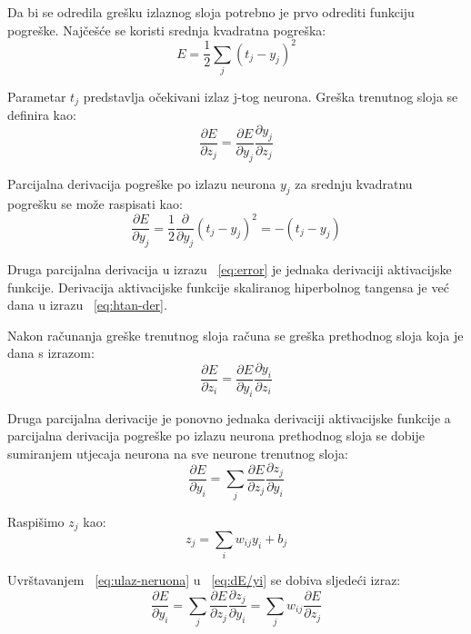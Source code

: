 \documentclass[times, utf8, zavrsni, numeric]{fer}
\begin{document}
Da bi se odredila grešku izlaznog sloja potrebno je prvo odrediti funkciju pogreške. Najčešće se koristi srednja kvadratna pogreška:
\begin{equation}\label{eq:sr-kv-pogr}
  E = \frac{1}{2}\sum_j(t_j-y_j)^2
\end{equation}

Parametar $t_j$ predstavlja očekivani izlaz j-tog neurona. Greška trenutnog sloja se definira kao:
\begin{equation}\label{eq:error}
\dfrac{\partial E}{\partial z_j} = \dfrac{\partial E}{\partial y_j} \dfrac{\partial y_j}{\partial z_j}
\end{equation}

Parcijalna derivacija pogreške po izlazu neurona $y_j$ za srednju kvadratnu pogrešku se može raspisati kao:
\begin{equation}\label{eq:sr-kv-pogr-der}
\dfrac{\partial E}{\partial y_j} = \frac{1}{2}\dfrac{\partial}{\partial y_j}(t_j-y_j)^2 = -(t_j - y_j)
\end{equation}

Druga parcijalna derivacija u izrazu ~\ref{eq:error} je jednaka derivaciji aktivacijske funkcije. Derivacija aktivacijske funkcije skaliranog hiperbolnog tangensa je već dana u izrazu ~\ref{eq:htan-der}.

Nakon računanja greške trenutnog sloja računa se greška prethodnog sloja koja je dana s izrazom:
\begin{equation}\label{eq:error-prethodni}
\dfrac{\partial E}{\partial z_i} = \dfrac{\partial E}{\partial y_i} \dfrac{\partial y_i}{\partial z_i} 
\end{equation}

Druga parcijalna derivacije je ponovno jednaka derivaciji aktivacijske funkcije a parcijalna derivacija pogreške po izlazu neurona prethodnog sloja se dobije sumiranjem utjecaja neurona na sve neurone trenutnog sloja:
\begin{equation}\label{eq:dE/yi}
\dfrac{\partial E}{\partial y_i} = \sum_j\dfrac{\partial E}{\partial z_j}\dfrac{\partial z_j}{\partial y_i} 
\end{equation}

Raspišimo $z_j$ kao:
\begin{equation}\label{eq:ulaz-neruona}
z_j = \sum_i w_{ij}y_i + b_j
\end{equation}

Uvrštavanjem ~\ref{eq:ulaz-neruona} u ~\ref{eq:dE/yi} se dobiva sljedeći izraz:
\begin{equation}\label{eq:dE/yi2}
\dfrac{\partial E}{\partial y_i} = \sum_j\dfrac{\partial E}{\partial z_j}\dfrac{\partial z_j}{\partial y_i} = \sum_j w_{ij}\dfrac{\partial E}{\partial z_j}
\end{equation}
\end{document}
